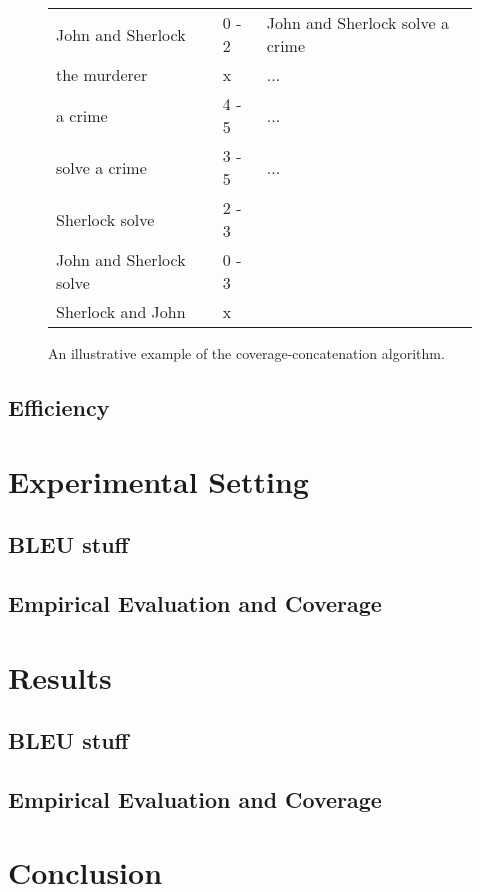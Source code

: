 \documentclass[11pt]{article}
\begin{document}
\begin{figure}
    \begin{tabular}{l|l|l}
    John and Sherlock       & 0 - 2 & John and Sherlock solve a crime \\
    the murderer            & x     & ...                             \\
    a crime                 & 4 - 5 & ...                             \\
    solve a crime           & 3 - 5 & ...                             \\
    Sherlock solve          & 2 - 3 & ~                               \\
    John and Sherlock solve & 0 - 3 & ~                               \\
    Sherlock and John       & x     & ~                               \\
    \end{tabular}
\caption{An illustrative example of the coverage-concatenation algorithm.}
    \label{algorithm}
\end{figure}


\subsection{Efficiency}

\section{Experimental Setting}

\subsection{BLEU stuff}

\subsection{Empirical Evaluation and Coverage}
\label{eval}

\section{Results}

\subsection{BLEU stuff}

\subsection{Empirical Evaluation and Coverage}

\section{Conclusion}

\end{document}
